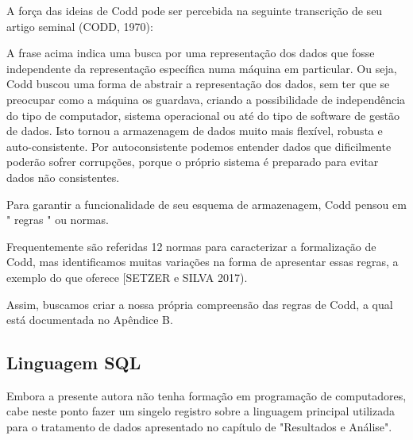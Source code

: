 A força das ideias de Codd pode ser percebida na seguinte transcrição de seu artigo seminal (CODD, 1970):


\noindent\begin{flushright}\mbox{\linespread{1}\selectfont\centering{}}\end{flushright}


A frase acima indica uma busca por uma representação dos dados que fosse independente da representação específica numa máquina em particular. Ou seja, Codd buscou uma forma de abstrair a representação dos dados, sem ter que se preocupar como a máquina os guardava, criando a possibilidade de independência do tipo de computador, sistema operacional ou até do tipo de software de gestão de dados. Isto tornou a armazenagem de dados muito mais flexível, robusta e auto-consistente. Por autoconsistente podemos entender dados que dificilmente poderão sofrer corrupções, porque o próprio sistema é preparado para evitar dados não consistentes.

Para garantir a funcionalidade de seu esquema de armazenagem, Codd pensou em " regras " ou normas.

Frequentemente são referidas 12 normas para caracterizar a formalização de Codd, mas identificamos muitas variações na forma de apresentar essas regras, a exemplo do que oferece [SETZER e SILVA 2017).

Assim, buscamos criar a nossa própria compreensão das regras de Codd, a qual está documentada no Apêndice B.

\subsection[Linguagem SQL]{Linguagem SQL}\label{Linguagem SQL}
Embora a presente autora não tenha formação em programação de computadores, cabe neste ponto fazer um singelo registro sobre a linguagem principal utilizada para o tratamento de dados apresentado no capítulo de "Resultados e Análise".

